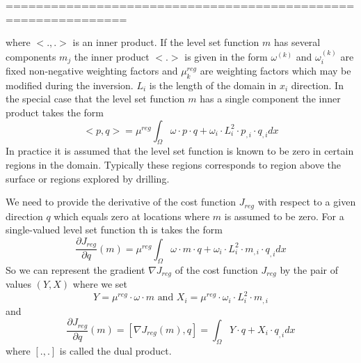 ==============================================================

where $<.,.>$ is an inner product. If the level set function  $m$ has several components $m_j$ the inner product $<.>$ is given
in the form 
$\omega^{(k)}$ and $\omega^{(k)}_i$ are fixed non-negative weighting factors and  $\mu^{reg}_k$ are weighting factors
which may be modified during the inversion.  $L_i$ is the length of the domain in $x_i$ direction. In the special case that 
the level set function  $m$ has a single component the inner product takes the form
\begin{equation}\label{EQU:REG:2b}
<p,q> = 
\mu^{reg} \int_{\Omega} \omega \cdot p \cdot q  + \omega_i \cdot L_i^2 \cdot p_{,i} \cdot q_{,i} dx
\end{equation} 
In practice it is assumed that the level set function is known to be zero in certain regions in the domain. Typically these regions
corresponds to region above the surface or regions explored by drilling.

We need to provide the derivative of the cost function $J_{reg}$ with respect to a given direction $q$ which equals zero at locations
where $m$ is assumed to be zero. For a single-valued 
level set function th is takes the form 
\begin{equation}\label{EQU:REG:3}
\frac{ \partial J_{reg}}{\partial q}(m) =
\mu^{reg} \int_{\Omega} \omega \cdot m \cdot q  + \omega_i \cdot L_i^2 \cdot m_{,i} \cdot q_{,i} dx
\end{equation} 
So we can represent the gradient $\nabla J_{reg}$ of the cost function $J_{reg}$ by the pair of values $(Y,X)$ where we set   
\begin{equation}\label{EQU:REG:3b}
Y=\mu^{reg} \cdot \omega \cdot m \mbox{ and } X_i = \mu^{reg} \cdot \omega_i \cdot L_i^2 \cdot m_{,i}
\end{equation} 
and 
\begin{equation}\label{EQU:REG:3c}
\frac{ \partial J_{reg}}{\partial q}(m) = [ \nabla J_{reg}(m), q ] =
\int_{\Omega} Y  \cdot q  + X_i  \cdot q_{,i} dx
\end{equation} 
where $[.,.]$ is called the dual product.

